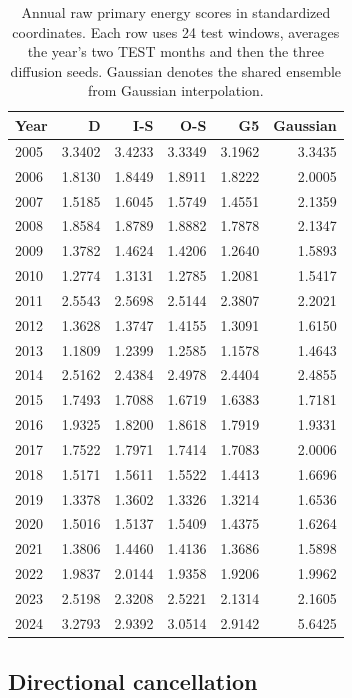 \documentclass{article}
\begin{document}
\begin{table}[ht]
\centering
\caption{Annual raw primary energy scores in standardized coordinates. Each row uses 24 test windows, averages the year's two TEST months and then the three diffusion seeds. Gaussian denotes the shared ensemble from Gaussian interpolation.}
\label{tab:years}
\begin{tabular}{lrrrrr}
\toprule
Year & D & I-S & O-S & G5 & Gaussian \\
\midrule
2005 & 3.3402 & 3.4233 & 3.3349 & 3.1962 & 3.3435 \\
2006 & 1.8130 & 1.8449 & 1.8911 & 1.8222 & 2.0005 \\
2007 & 1.5185 & 1.6045 & 1.5749 & 1.4551 & 2.1359 \\
2008 & 1.8584 & 1.8789 & 1.8882 & 1.7878 & 2.1347 \\
2009 & 1.3782 & 1.4624 & 1.4206 & 1.2640 & 1.5893 \\
2010 & 1.2774 & 1.3131 & 1.2785 & 1.2081 & 1.5417 \\
2011 & 2.5543 & 2.5698 & 2.5144 & 2.3807 & 2.2021 \\
2012 & 1.3628 & 1.3747 & 1.4155 & 1.3091 & 1.6150 \\
2013 & 1.1809 & 1.2399 & 1.2585 & 1.1578 & 1.4643 \\
2014 & 2.5162 & 2.4384 & 2.4978 & 2.4404 & 2.4855 \\
2015 & 1.7493 & 1.7088 & 1.6719 & 1.6383 & 1.7181 \\
2016 & 1.9325 & 1.8200 & 1.8618 & 1.7919 & 1.9331 \\
2017 & 1.7522 & 1.7971 & 1.7414 & 1.7083 & 2.0006 \\
2018 & 1.5171 & 1.5611 & 1.5522 & 1.4413 & 1.6696 \\
2019 & 1.3378 & 1.3602 & 1.3326 & 1.3214 & 1.6536 \\
2020 & 1.5016 & 1.5137 & 1.5409 & 1.4375 & 1.6264 \\
2021 & 1.3806 & 1.4460 & 1.4136 & 1.3686 & 1.5898 \\
2022 & 1.9837 & 2.0144 & 1.9358 & 1.9206 & 1.9962 \\
2023 & 2.5198 & 2.3208 & 2.5221 & 2.1314 & 2.1605 \\
2024 & 3.2793 & 2.9392 & 3.0514 & 2.9142 & 5.6425 \\
\bottomrule
\end{tabular}
\end{table}

\subsection{Directional cancellation}
\end{document}
